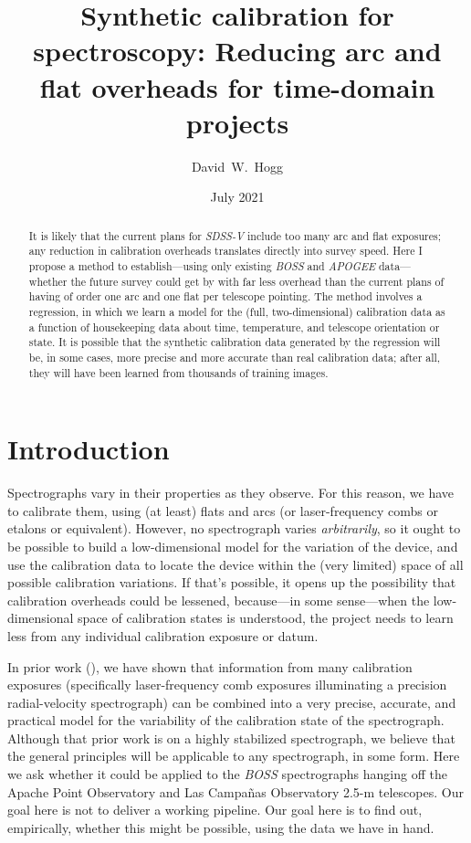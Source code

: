 \documentclass[modern]{aastex631}
\newcommand{\project}[1]{\textsl{#1}}
\newcommand{\acronym}[1]{{\small{#1}}}
\newcommand{\SDSSV}{\project{\acronym{SDSS-V}}}
\newcommand{\BOSS}{\project{\acronym{BOSS}}}
\newcommand{\APOGEE}{\project{\acronym{APOGEE}}}
\begin{document}
\title{Synthetic calibration for spectroscopy: Reducing arc and flat overheads for time-domain projects}
\author{David~W.~Hogg}
\date{July 2021}

\begin{abstract}\noindent
    It is likely that the current plans for \SDSSV{} include too many arc and flat exposures; any reduction in calibration overheads translates directly into survey speed.
    Here I propose a method to establish---using only existing \BOSS{} and \APOGEE{} data---whether the future survey could get by with far less overhead than the current plans of having of order one arc and one flat per telescope pointing.
    The method involves a regression, in which we learn a model for the (full, two-dimensional) calibration data as a function of housekeeping data about time, temperature, and telescope orientation or state.
    It is possible that the synthetic calibration data generated by the regression will be, in some cases, more precise and more accurate than real calibration data; after all, they will have been learned from thousands of training images.
\end{abstract}

\section{Introduction}\label{sec:intro}\noindent
Spectrographs vary in their properties as they observe.
For this reason, we have to calibrate them, using (at least) flats and arcs (or laser-frequency combs or etalons or equivalent).
However, no spectrograph varies \emph{arbitrarily}, so it ought to be possible to build a low-dimensional model for the variation of the device, and use the calibration data to locate the device within the (very limited) space of all possible calibration variations.
If that's possible, it opens up the possibility that calibration overheads could be lessened, because---in some sense---when the low-dimensional space of calibration states is understood, the project needs to learn less from any individual calibration exposure or datum.

In prior work (\citealt{excalibur}), we have shown that information from many calibration exposures (specifically laser-frequency comb exposures illuminating a precision radial-velocity spectrograph) can be combined into a very precise, accurate, and practical model for the variability of the calibration state of the spectrograph.
Although that prior work is on a highly stabilized spectrograph, we believe that the general principles will be applicable to any spectrograph, in some form.
Here we ask whether it could be applied to the \BOSS{} spectrographs hanging off the Apache Point Observatory and Las Campa\~nas Observatory 2.5-m telescopes.
Our goal here is not to deliver a working pipeline.
Our goal here is to find out, empirically, whether this might be possible, using the data we have in hand.
\end{document}
